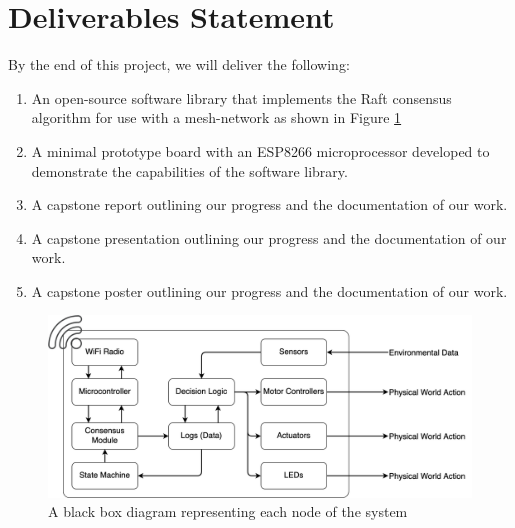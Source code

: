 \section{Deliverables Statement}

By the end of this project, we will deliver the following: 

\begin{enumerate}
  \item An open-source software library that implements the Raft consensus algorithm for use with a mesh-network as shown in Figure \ref{fig:del_black_box}
  \item A minimal prototype board with an ESP8266 microprocessor developed to demonstrate the capabilities of the software library.
  \item A capstone report outlining our progress and the documentation of our work.
  \item A capstone presentation outlining our progress and the documentation of our work.
  \item A capstone poster outlining our progress and the documentation of our work.
\end{enumerate}

\begin{figure}[H]
    \centering
    \includegraphics[width=0.65\columnwidth]{final-proposal/images/deliverable_blackbox.png}
    \caption{A black box diagram representing each node of the system}
    \label{fig:del_black_box}
\end{figure}
